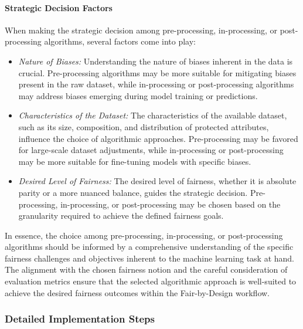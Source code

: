 \paragraph{Strategic Decision Factors}

When making the strategic decision among pre-processing, in-processing, or post-processing algorithms, several factors come into play:

\begin{itemize}
    \item \emph{Nature of Biases:} Understanding the nature of biases inherent in the data is crucial. Pre-processing algorithms may be more suitable for mitigating biases present in the raw dataset, while in-processing or post-processing algorithms may address biases emerging during model training or predictions.

    \item \emph{Characteristics of the Dataset:} The characteristics of the available dataset, such as its size, composition, and distribution of protected attributes, influence the choice of algorithmic approaches. Pre-processing may be favored for large-scale dataset adjustments, while in-processing or post-processing may be more suitable for fine-tuning models with specific biases.

    \item \emph{Desired Level of Fairness:} The desired level of fairness, whether it is absolute parity or a more nuanced balance, guides the strategic decision. Pre-processing, in-processing, or post-processing may be chosen based on the granularity required to achieve the defined fairness goals.

\end{itemize}

In essence, the choice among pre-processing, in-processing, or post-processing algorithms should be informed by a comprehensive understanding of the specific fairness challenges and objectives inherent to the machine learning task at hand. The alignment with the chosen fairness notion and the careful consideration of evaluation metrics ensure that the selected algorithmic approach is well-suited to achieve the desired fairness outcomes within the Fair-by-Design workflow.


\subsubsection{Detailed Implementation Steps}


